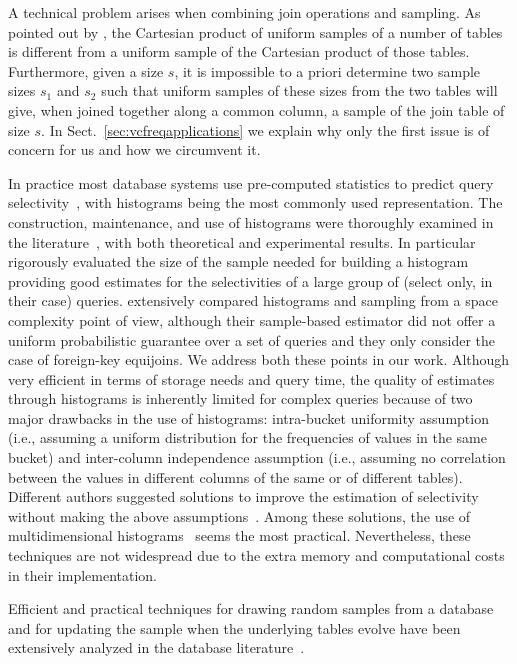 A technical problem arises when combining join operations and sampling. As
pointed out by \citet{ChaudhuriMN99}, the Cartesian
product of uniform samples of a number of tables is different from a uniform sample of the
Cartesian product of those tables. Furthermore, given a size $s$, it is
impossible to a priori determine two sample sizes $s_1$ and $s_2$ such that
uniform samples of these sizes from the two tables will give, when joined
together along a common column, a sample of the join table of size $s$. In
Sect.~\ref{sec:vcfreqapplications} we explain why only the first issue is of concern
for us and how we circumvent it.

In practice most database systems use pre-computed statistics to predict query
selectivity~\citep{HouOT88,GibbonsM98,GantiLR00,JinGJA06,LarsonLZZ07}, with
histograms being the most commonly used representation. The construction,
maintenance, and use of histograms were thoroughly examined in the
literature~\citep{JagadishKMPSS98,IoannidisP95,MatiasVW98,PoosalaHIS96}, with
both theoretical and experimental results. In particular~\citet{ChaudhuriMN98}
rigorously evaluated the size of the
sample needed for
building a histogram providing good estimates for the selectivities of a large
group of (select only, in their case) queries.  \citet{KaushikNRC05} extensively compared histograms and
sampling from a
space complexity point of view, although their sample-based estimator did not
offer a uniform probabilistic guarantee over a set of queries and they only
consider the case of foreign-key equijoins. We address both these points in our
work. Although very efficient in terms of storage needs and query time, the
quality of estimates through histograms is inherently limited for complex
queries because of two major drawbacks in the use of histograms: intra-bucket
uniformity assumption (i.e., assuming a uniform distribution for the frequencies
of values in the same bucket) and inter-column independence assumption (i.e.,
assuming no correlation between the values in different columns of the same or
of different tables).  Different authors suggested solutions to improve the
estimation of selectivity without making the above
assumptions~\citep{BrunoC04,Dobra05,PoosalaI97,WangVI97,WangS03}. Among these
solutions, the use of multidimensional
histograms~\citep{BrunoCG01,PoosalaI97,SrivastavaHMKT,WangS03} seems the most
practical. Nevertheless, these techniques are not widespread due to the extra
memory and computational costs in their implementation.

Efficient and practical techniques for drawing random samples from a database
and for updating  the sample when the underlying tables evolve have been extensively
analyzed in the database
literature~\citep{BrownH06,GemullaLH06,GemullaLH07,HaasK04,JermainePA04}.

